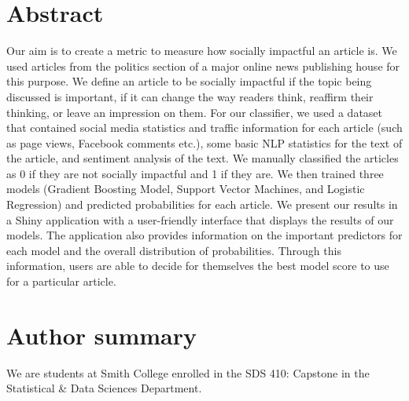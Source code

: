 \documentclass[10pt,letterpaper]{article}
\date{}
\newcommand{\getIndex}[2]{
  \ForEach{,}{\IfEq{#1}{\thislevelitem}{\number\thislevelcount\ExitForEach}{}}{#2}
}
\newcommand{\getAff}[1]{
  \getIndex{#1}{}
}
\begin{document}
\vspace*{0.2in}

\section*{Abstract}
Our aim is to create a metric to measure how socially impactful an
article is. We used articles from the politics section of a major online
news publishing house for this purpose. We define an article to be
socially impactful if the topic being discussed is important, if it can
change the way readers think, reaffirm their thinking, or leave an
impression on them. For our classifier, we used a dataset that contained
social media statistics and traffic information for each article (such
as page views, Facebook comments etc.), some basic NLP statistics for
the text of the article, and sentiment analysis of the text. We manually
classified the articles as 0 if they are not socially impactful and 1 if
they are. We then trained three models (Gradient Boosting Model, Support
Vector Machines, and Logistic Regression) and predicted probabilities
for each article. We present our results in a Shiny application with a
user-friendly interface that displays the results of our models. The
application also provides information on the important predictors for
each model and the overall distribution of probabilities. Through this
information, users are able to decide for themselves the best model
score to use for a particular article.

\section*{Author summary}
We are students at Smith College enrolled in the SDS 410: Capstone in
the Statistical \& Data Sciences Department.
\end{document}
